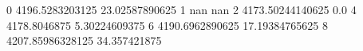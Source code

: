0 4196.5283203125 23.02587890625
1 nan nan
2 4173.50244140625 0.0
4 4178.8046875 5.30224609375
6 4190.6962890625 17.19384765625
8 4207.85986328125 34.357421875
